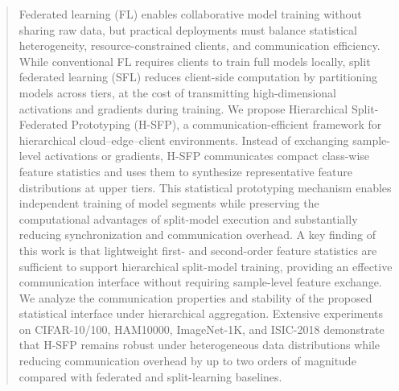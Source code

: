 \begin{abstract}
    Federated learning (FL) enables collaborative model training without sharing raw data, but practical deployments must balance statistical heterogeneity, resource-constrained clients, and communication efficiency. While conventional FL requires clients to train full models locally, split federated learning (SFL) reduces client-side computation by partitioning models across tiers, at the cost of transmitting high-dimensional activations and gradients during training. We propose Hierarchical Split-Federated Prototyping (H-SFP), a communication-efficient framework for hierarchical cloud–edge–client environments. Instead of exchanging sample-level activations or gradients, H-SFP communicates compact class-wise feature statistics and uses them to synthesize representative feature distributions at upper tiers. This statistical prototyping mechanism enables independent training of model segments while preserving the computational advantages of split-model execution and substantially reducing synchronization and communication overhead.
    A key finding of this work is that lightweight first- and second-order feature statistics are sufficient to support hierarchical split-model training, providing an effective communication interface without requiring sample-level feature exchange. We analyze the communication properties and stability of the proposed statistical interface under hierarchical aggregation. Extensive experiments on CIFAR-10/100, HAM10000, ImageNet-1K, and ISIC-2018 demonstrate that H-SFP remains robust under heterogeneous data distributions while reducing communication overhead by up to two orders of magnitude compared with federated and split-learning baselines.
\end{abstract}


